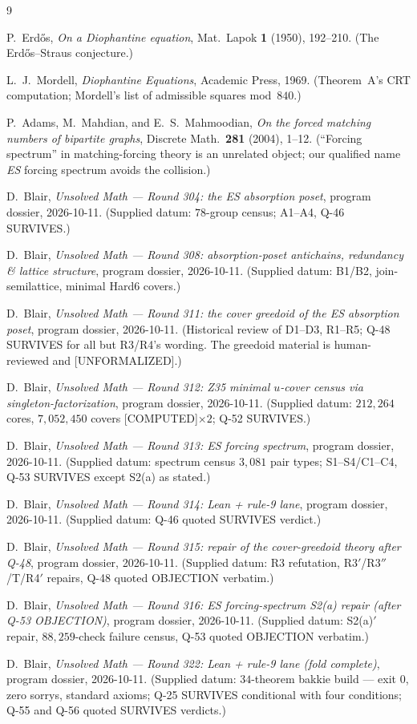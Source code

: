 \documentclass[11pt,a4paper]{article}
\theoremstyle{definition}
\begin{document}
\begin{thebibliography}{9}

P.~Erd\H{o}s,
\emph{On a Diophantine equation},
Mat.\ Lapok \textbf{1} (1950), 192--210.
(The Erd\H{o}s--Straus conjecture.)

L.~J.~Mordell,
\emph{Diophantine Equations},
Academic Press, 1969.
(Theorem~A's CRT computation; Mordell's list of admissible squares
mod~$840$.)

P.~Adams, M.~Mahdian, and E.~S.~Mahmoodian,
\emph{On the forced matching numbers of bipartite graphs},
Discrete Math.\ \textbf{281} (2004), 1--12.
(``Forcing spectrum'' in matching-forcing theory is an unrelated object;
our qualified name \emph{ES} forcing spectrum avoids the collision.)

D.~Blair,
\emph{Unsolved Math --- Round 304: the ES absorption poset},
program dossier, 2026-10-11.
(Supplied datum: $78$-group census; A1--A4, Q-46 SURVIVES.)

D.~Blair,
\emph{Unsolved Math --- Round 308: absorption-poset antichains, redundancy
\& lattice structure},
program dossier, 2026-10-11.
(Supplied datum: B1/B2, join-semilattice, minimal Hard6 covers.)

D.~Blair,
\emph{Unsolved Math --- Round 311: the cover greedoid of the ES absorption
poset},
program dossier, 2026-10-11.
(Historical review of D1--D3, R1--R5; Q-48 SURVIVES for all but R3/R4's
wording. The greedoid material is human-reviewed and [UNFORMALIZED].)

D.~Blair,
\emph{Unsolved Math --- Round 312: Z35 minimal $u$-cover census via
singleton-factorization},
program dossier, 2026-10-11.
(Supplied datum: $212{,}264$ cores, $7{,}052{,}450$ covers
[COMPUTED]$\times2$; Q-52 SURVIVES.)

D.~Blair,
\emph{Unsolved Math --- Round 313: ES forcing spectrum},
program dossier, 2026-10-11.
(Supplied datum: spectrum census $3{,}081$ pair types; S1--S4/C1--C4,
Q-53 SURVIVES except S2(a) as stated.)

D.~Blair,
\emph{Unsolved Math --- Round 314: Lean + rule-9 lane},
program dossier, 2026-10-11.
(Supplied datum: Q-46 quoted SURVIVES verdict.)

D.~Blair,
\emph{Unsolved Math --- Round 315: repair of the cover-greedoid theory
after Q-48},
program dossier, 2026-10-11.
(Supplied datum: R3 refutation, R3$'$/R3$''$/T/R4$'$ repairs, Q-48 quoted
OBJECTION verbatim.)

D.~Blair,
\emph{Unsolved Math --- Round 316: ES forcing-spectrum S2(a) repair (after
Q-53 OBJECTION)},
program dossier, 2026-10-11.
(Supplied datum: S2(a)$'$ repair, $88{,}259$-check failure census,
Q-53 quoted OBJECTION verbatim.)

D.~Blair,
\emph{Unsolved Math --- Round 322: Lean + rule-9 lane (fold complete)},
program dossier, 2026-10-11.
(Supplied datum: $34$-theorem bakkie build --- exit $0$, zero sorrys,
standard axioms; Q-25 SURVIVES conditional with four conditions; Q-55 and
Q-56 quoted SURVIVES verdicts.)

\end{thebibliography}
\end{document}
